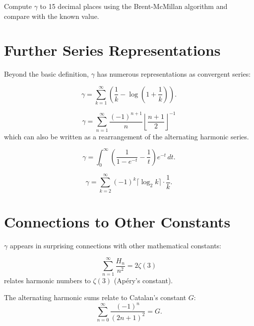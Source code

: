 \begin{exercise}[Computational]
Compute $\gamma$ to 15 decimal places using the Brent-McMillan algorithm and compare with the known value.
\end{exercise}

\section{Further Series Representations}

Beyond the basic definition, $\gamma$ has numerous representations as convergent series:

\begin{theorem}
\[
\gamma = \sum_{k=1}^\infty \left(\frac{1}{k} - \log\left(1 + \frac{1}{k}\right)\right).
\]
\end{theorem}

\begin{theorem}
\[
\gamma = \sum_{n=1}^\infty \frac{(-1)^{n+1}}{n} \left\lfloor \frac{n+1}{2} \right\rfloor^{-1}
\]
which can also be written as a rearrangement of the alternating harmonic series.
\end{theorem}

\begin{theorem}
\[
\gamma = \int_0^\infty \left(\frac{1}{1-e^{-t}} - \frac{1}{t}\right) e^{-t}\, dt.
\]
\end{theorem}

\begin{theorem}
\[
\gamma = \sum_{k=2}^\infty (-1)^k \lceil \log_2 k \rceil \cdot \frac{1}{k}.
\]
\end{theorem}

\section{Connections to Other Constants}

$\gamma$ appears in surprising connections with other mathematical constants:

\begin{theorem}
\[
\sum_{n=1}^\infty \frac{H_n}{n^2} = 2\zeta(3)
\]
relates harmonic numbers to $\zeta(3)$ (Ap\'{e}ry's constant).
\end{theorem}

\begin{theorem}
The alternating harmonic sums relate to Catalan's constant $G$:
\[
\sum_{n=0}^\infty \frac{(-1)^n}{(2n+1)^2} = G.
\]
\end{theorem}

